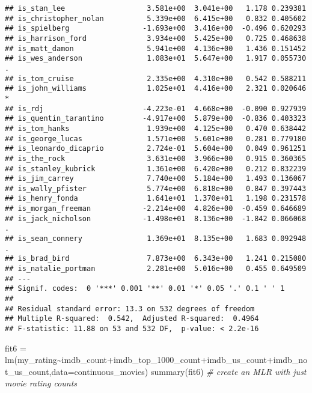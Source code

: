 \documentclass[
]{article}
\newenvironment{Shaded}{\begin{snugshade}}{\end{snugshade}}
\newcommand{\AttributeTok}[1]{\textcolor[rgb]{0.77,0.63,0.00}{#1}}
\newcommand{\CommentTok}[1]{\textcolor[rgb]{0.56,0.35,0.01}{\textit{#1}}}
\newcommand{\FunctionTok}[1]{\textcolor[rgb]{0.00,0.00,0.00}{#1}}
\newcommand{\NormalTok}[1]{#1}
\newcommand{\OtherTok}[1]{\textcolor[rgb]{0.56,0.35,0.01}{#1}}
\newcommand{\SpecialCharTok}[1]{\textcolor[rgb]{0.00,0.00,0.00}{#1}}
\begin{document}
\begin{verbatim}
## is_stan_lee                   3.581e+00  3.041e+00   1.178 0.239381    
## is_christopher_nolan          5.339e+00  6.415e+00   0.832 0.405602    
## is_spielberg                 -1.693e+00  3.416e+00  -0.496 0.620293    
## is_harrison_ford              3.934e+00  5.425e+00   0.725 0.468638    
## is_matt_damon                 5.941e+00  4.136e+00   1.436 0.151452    
## is_wes_anderson               1.083e+01  5.647e+00   1.917 0.055730 .  
## is_tom_cruise                 2.335e+00  4.310e+00   0.542 0.588211    
## is_john_williams              1.025e+01  4.416e+00   2.321 0.020646 *  
## is_rdj                       -4.223e-01  4.668e+00  -0.090 0.927939    
## is_quentin_tarantino         -4.917e+00  5.879e+00  -0.836 0.403323    
## is_tom_hanks                  1.939e+00  4.125e+00   0.470 0.638442    
## is_george_lucas               1.571e+00  5.601e+00   0.281 0.779180    
## is_leonardo_dicaprio          2.724e-01  5.604e+00   0.049 0.961251    
## is_the_rock                   3.631e+00  3.966e+00   0.915 0.360365    
## is_stanley_kubrick            1.361e+00  6.420e+00   0.212 0.832239    
## is_jim_carrey                 7.740e+00  5.184e+00   1.493 0.136067    
## is_wally_pfister              5.774e+00  6.818e+00   0.847 0.397443    
## is_henry_fonda                1.641e+01  1.370e+01   1.198 0.231578    
## is_morgan_freeman            -2.214e+00  4.826e+00  -0.459 0.646689    
## is_jack_nicholson            -1.498e+01  8.136e+00  -1.842 0.066068 .  
## is_sean_connery               1.369e+01  8.135e+00   1.683 0.092948 .  
## is_brad_bird                  7.873e+00  6.343e+00   1.241 0.215080    
## is_natalie_portman            2.281e+00  5.016e+00   0.455 0.649509    
## ---
## Signif. codes:  0 '***' 0.001 '**' 0.01 '*' 0.05 '.' 0.1 ' ' 1
## 
## Residual standard error: 13.3 on 532 degrees of freedom
## Multiple R-squared:  0.542,  Adjusted R-squared:  0.4964 
## F-statistic: 11.88 on 53 and 532 DF,  p-value: < 2.2e-16
\end{verbatim}

\begin{Shaded}
\begin{Highlighting}[]
\NormalTok{fit6 }\OtherTok{=} \FunctionTok{lm}\NormalTok{(my\_rating}\SpecialCharTok{\textasciitilde{}}\NormalTok{imdb\_count}\SpecialCharTok{+}\NormalTok{imdb\_top\_1000\_count}\SpecialCharTok{+}\NormalTok{imdb\_us\_count}\SpecialCharTok{+}\NormalTok{imdb\_not\_us\_count,}\AttributeTok{data=}\NormalTok{continuous\_movies)}
\FunctionTok{summary}\NormalTok{(fit6) }\CommentTok{\# create an MLR with just movie rating counts}
\end{Highlighting}
\end{Shaded}
\end{document}
